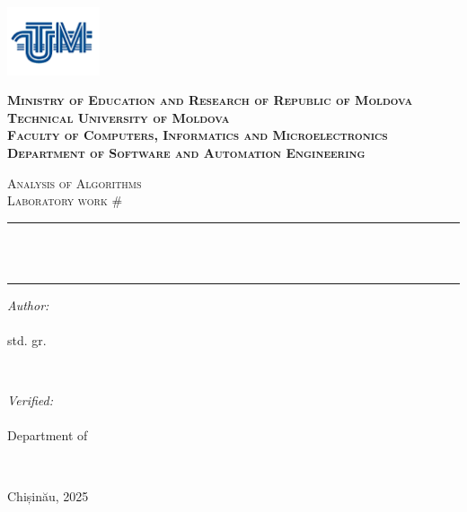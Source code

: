 \makeatletter
\begin{titlepage}
\centering

\includegraphics[height=2cm]{utm_logo.png}

\bfseries
\textsc{Ministry of Education and Research of Republic of Moldova} \\
\textsc{Technical University of Moldova} \\
\textsc{Faculty of Computers, Informatics and Microelectronics} \\
\textsc{Department of Software and Automation Engineering} \\
\mdseries

\vfill

\textsc{\Large Analysis of Algorithms} \\
\textsc{\large Laboratory work \#\@labno}\\[0.5cm]

\vspace{12pt}
\newcommand{\HRule}{\rule{\linewidth}{0.5mm}}
\HRule \\[0.2cm]
{ \LARGE \bfseries \@title }\\[0.4cm]
\HRule
\vfill

\begin{minipage}[t]{0.4\textwidth}
\begin{flushleft} \large
\emph{Author:} \\
\@author\\                        
std. gr. \@group
\end{flushleft}
\end{minipage}
~
\begin{minipage}[t]{0.4\textwidth}
\raggedleft \large
\emph{Verified:} \\
\@prof \\
Department of \textsc{\@profdep}
\end{minipage}\\[3cm]
\vfill

Chișinău, 2025
\end{titlepage}
\makeatother
\setcounter{page}{2}
